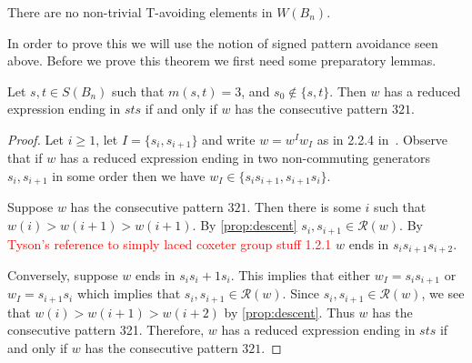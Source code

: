 \begin{theorem}\label{thm:classificationofB}
There are no non-trivial T-avoiding elements in $W(B_n)$.	
\end{theorem}
 
In order to prove this we will use the notion of signed pattern avoidance seen above. Before we prove this theorem we first need some preparatory lemmas. 

\begin{lemma}\label{lem:sts}
Let $s,t \in S(B_n)$ such that $m(s,t)=3$, and $s_0 \notin \{s,t\}.$ Then $w$ has a reduced expression ending in $sts$ if and only if $w$ has the consecutive pattern $321$.
\begin{proof}
	Let $i \geq 1$, let $I=\{s_i,s_{i+1}\}$ and write $w=w^Iw_I$ as in 2.2.4 in~\cite{Bjorner2005}. Observe that if $w$ has a reduced expression ending in two non-commuting generators $s_i, s_{i+1}$ in some order then we have $w_I \in \{s_is_{i+1}, s_{i+1}s_i\}$.
	
	Suppose $w$ has the consecutive pattern $321$. Then there is some $i$ such that $w(i) > w(i+1) > w(i+1)$. By \ref{prop:descent} $s_i,s_{i+1} \in \mathcal{R}(w)$. By \textcolor{red}{Tyson's reference to simply laced coxeter group stuff 1.2.1} $w$ ends in $s_is_{i+1}s_{i+2}$.
	
	Conversely, suppose $w$ ends in $s_is_i+1s_i$. This implies that either $w_I=s_is_{i+1}$ or $w_I=s_{i+1}s_i$ which implies that $s_i,s_{i+1} \in \mathcal{R}(w)$. Since $s_i,s_{i+1} \in \mathcal{R}(w)$, we see that $w(i)>w(i+1)>w(i+2)$ by \ref{prop:descent}. Thus $w$ has the consecutive pattern 321.
	Therefore, $w$ has a reduced expression ending in $sts$ if and only if $w$ has the consecutive pattern $321$. 
\end{proof}	
\end{lemma}

